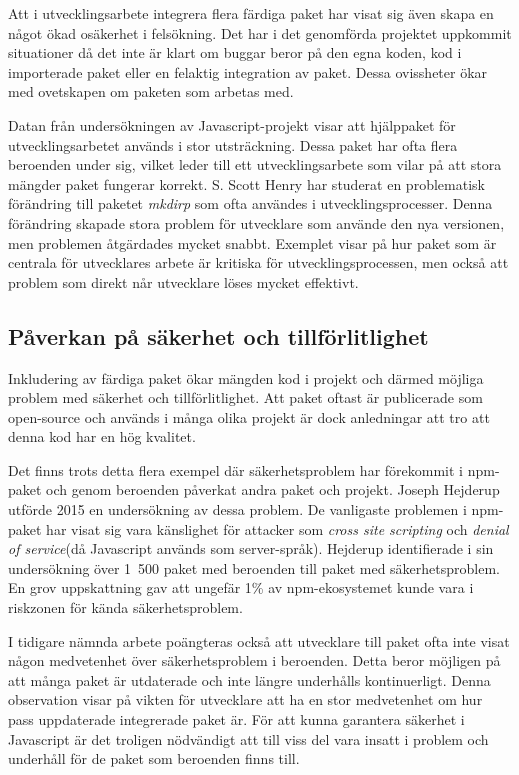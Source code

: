 Att i utvecklingsarbete integrera flera färdiga paket har visat sig även skapa en något ökad osäkerhet i felsökning. Det har i det genomförda projektet uppkommit situationer då det inte är klart om buggar beror på den egna koden, kod i importerade paket eller en felaktig integration av paket. Dessa ovissheter ökar med ovetskapen om paketen som arbetas med.

Datan från undersökningen av Javascript-projekt visar att hjälppaket för utvecklingsarbetet används i stor utsträckning. Dessa paket har ofta flera beroenden under sig, vilket leder till ett utvecklingsarbete som vilar på att stora mängder paket fungerar korrekt. S. Scott Henry har studerat en problematisk förändring till paketet \textit{mkdirp} som ofta användes i utvecklingsprocesser.\cite{Henry2017} Denna förändring skapade stora problem för utvecklare som använde den nya versionen, men problemen åtgärdades mycket snabbt. Exemplet visar på hur paket som är centrala för utvecklares arbete är kritiska för utvecklingsprocessen, men också att problem som direkt når utvecklare löses mycket effektivt.

\subsection{Påverkan på säkerhet och tillförlitlighet}
Inkludering av färdiga paket ökar mängden kod i projekt och därmed möjliga problem med säkerhet och tillförlitlighet. Att paket oftast är publicerade som open-source och används i många olika projekt är dock anledningar att tro att denna kod har en hög kvalitet.\cite{coverity-scan2013}

Det finns trots detta flera exempel där säkerhetsproblem har förekommit i npm-paket och genom beroenden påverkat andra paket och projekt. Joseph Hejderup utförde 2015 en undersökning av dessa problem.\cite{Hejderup2017} De vanligaste problemen i npm-paket har visat sig vara känslighet för attacker som \textit{cross site scripting} och \textit{denial of service}(då Javascript används som server-språk). Hejderup identifierade i sin undersökning över 1~500 paket med beroenden till paket med säkerhetsproblem. En grov uppskattning gav att ungefär 1\% av npm-ekosystemet kunde vara i riskzonen för kända säkerhetsproblem.

I tidigare nämnda arbete poängteras också att utvecklare till paket ofta inte visat någon medvetenhet över säkerhetsproblem i beroenden. Detta beror möjligen på att många paket är utdaterade och inte längre underhålls kontinuerligt. Denna observation visar på vikten för utvecklare att ha en stor medvetenhet om hur pass uppdaterade integrerade paket är. För att kunna garantera säkerhet i Javascript är det troligen nödvändigt att till viss del vara insatt i problem och underhåll för de paket som beroenden finns till.

